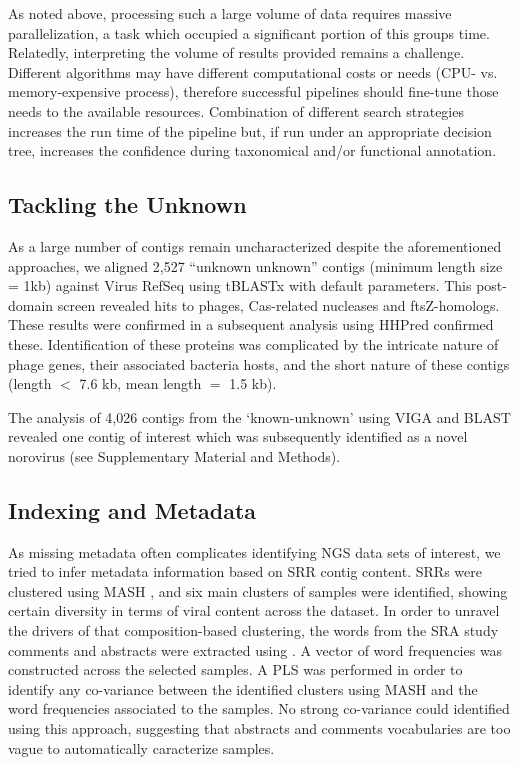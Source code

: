 \documentclass[genes, moreauthors]{Definitions/mdpi}
\begin{document}
  As noted above, processing such a large volume of data requires massive
  parallelization, a task which occupied a significant portion of this groups
  time. Relatedly, interpreting the volume of results provided remains a
  challenge. Different algorithms may have different computational costs or
  needs (CPU- vs. memory-expensive process), therefore successful pipelines
  should fine-tune those needs to the available resources. Combination of
  different search strategies increases the run time of the pipeline but, if
  run under an appropriate decision tree, increases the confidence during
  taxonomical and/or functional annotation.


  \subsection{Tackling the Unknown}
  As a large number of contigs remain uncharacterized despite the
  aforementioned approaches, we  aligned 2,527 “unknown unknown” contigs
  (minimum length size = 1kb) against Virus RefSeq using tBLASTx
  \cite{Camacho2009} with default parameters. This post-domain screen revealed
  hits to phages, Cas-related nucleases and ftsZ-homologs. These results were
  confirmed in a subsequent analysis using HHPred \cite{Hildebrand2009}
  confirmed these. Identification of these proteins was complicated by the
  intricate nature of phage genes, their associated bacteria hosts, and the
  short nature of these contigs (length $<$ 7.6 kb, mean length $=$ 1.5 kb).

  The analysis of 4,026 contigs from the ‘known-unknown’ using VIGA
  \cite{Gonzalez-Tortuero2018} and BLAST \cite{Camacho2009} revealed one contig
  of interest which was subsequently identified as a novel norovirus (see
  Supplementary Material and Methods).

  \subsection{Indexing and Metadata}
  As missing metadata often complicates identifying NGS data sets of interest,
  we tried to infer metadata information based on SRR contig content. SRRs were
  clustered using MASH \cite{Ondov2019}, and six main clusters of samples were
  identified, showing certain diversity in terms of viral content across the
  dataset. In order to unravel the drivers of that composition-based
  clustering, the words from the SRA study comments and abstracts were
  extracted using \cite{Zhu2013}. A vector of word frequencies was constructed
  across the selected samples. A PLS was performed in order to identify any
  co-variance between the identified clusters using MASH and the word
  frequencies associated to the samples. No strong co-variance could identified
  using this approach, suggesting that abstracts and comments vocabularies are
  too vague to automatically caracterize samples.
\end{document}
